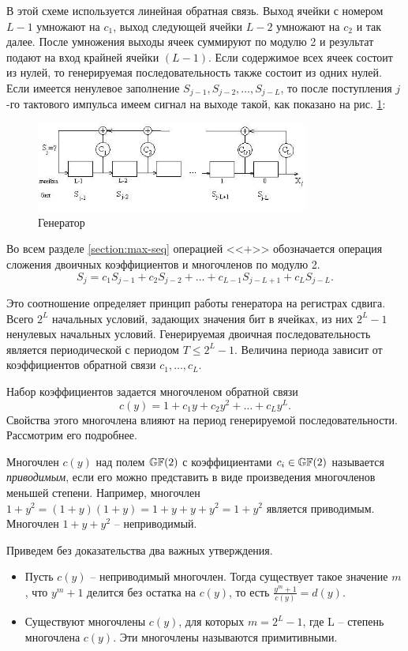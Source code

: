 В этой схеме используется линейная обратная связь. Выход ячейки с номером $L-1$ умножают на $c_{1}$,  выход следующей ячейки $L-2$ умножают на $c_2$ и так далее. После умножения выходы ячеек суммируют по модулю 2 и результат подают на вход крайней ячейки $(L-1)$. Если содержимое всех ячеек состоит из нулей, то  генерируемая последовательность  также состоит из одних нулей. Если имеется ненулевое заполнение $S_{j-1}, S_{j-2}, \dots, S_{j-L}$, то после поступления $j$-го тактового импульса имеем сигнал на выходе такой, как показано  на рис. \ref{fig:generator}:
\begin{figure}[h!]
	\centering
	\includegraphics[width=0.8\textwidth]{pic/generator}
    \caption{Генератор\label{fig:generator}}
\end{figure}

Во всем разделе \ref{section:max-seq}  операцией <<$+$>>  обозначается операция сложения двоичных коэффициентов и многочленов по модулю 2.
\[
    S_{j} = c_{1} S_{j-1} + c_{2} S_{j-2} +  \dots  + c_{L-1} S_{j-L+1} + c_{L} S_{j-L}.
\]

Это соотношение определяет принцип  работы генератора на регистрах сдвига. Всего $2^{L}$ начальных условий, задающих значения бит в ячейках, из них $2^{L}-1$ ненулевых начальных условий. Генерируемая двоичная последовательность является периодической с периодом $T\leq 2^{L}-1$. Величина  периода зависит от коэффициентов обратной связи $c_{1},  \ldots,  c_{L} $.

Набор коэффициентов задается многочленом обратной связи
    \[ c(y) = 1 + c_1 y+ c_2 y^2 + \dots + c_L y^L. \]
Свойства этого многочлена влияют на период генерируемой последовательности. Рассмотрим его подробнее.

Многочлен $c(y)$ над полем $\mathbb{GF}(2)$ с коэффициентами $c_i \in \mathbb{GF}(2)$ называется \textit{приводимым}, если его можно представить в виде произведения многочленов меньшей степени. Например, многочлен $1 + y^{2} = (1 + y) (1 + y) = 1 + y + y + y^2 = 1 + y^2$ является приводимым. Многочлен $1 + y + y^{2}$ -- неприводимый.

Приведем без доказательства два важных утверждения.
\begin{itemize}
    \item Пусть $c(y)$ -- неприводимый многочлен. Тогда существует такое значение $m$, что $y^{m} + 1$ делится без остатка на $c(y)$, то есть $\frac{y^{m} + 1}{c(y)} = d(y)$.
    \item Существуют многочлены $c(y)$, для которых $m=2^{L} - 1$, где L -- степень многочлена $c(y)$. Эти многочлены называются примитивными.
\end{itemize}

